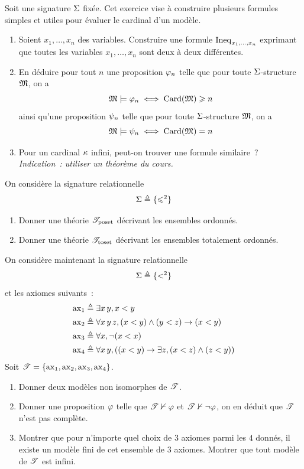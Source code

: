 \begin{exercise}
  Soit une signature $\Sigma$ fixée. Cet exercice vise à construire plusieurs
  formules simples et utiles pour évaluer le cardinal d'un modèle.
  \begin{enumerate}[label = (\roman*)]
  \item Soient $x_1,\ldots,x_n$ des variables. Construire une formule
    $\operatorname{Ineq}_{x_1,\ldots,x_n}$ exprimant que toutes les variables
    $x_1,\ldots,x_n$ sont deux à deux différentes.
  \item En déduire pour tout $n$ une proposition $\varphi_n$ telle que pour
    toute $\Sigma$-structure $\mathfrak{M}$, on a
    \[\mathfrak{M}\models \varphi_n \iff \operatorname{Card}(\mathfrak{M}) \geqslant n\]
    ainsi qu'une proposition $\psi_n$ telle que pour toute $\Sigma$-structure
    $\mathfrak{M}$, on a
    \[\mathfrak{M}\models \psi_n \iff \operatorname{Card}(\mathfrak{M}) = n\]
  \item Pour un cardinal $\kappa$ infini, peut-on trouver une formule
    similaire~? \textit{Indication~: utiliser un théorème du cours.}
  \end{enumerate}
\end{exercise}

\begin{exercise}
    On considère la signature relationnelle
    \[\Sigma \triangleq \{\leqslant^2\}\]
    \begin{enumerate}[label=(\roman*)]
        \item Donner une théorie $\mathscr T_{\operatorname{poset}}$ décrivant les
        ensembles ordonnés.
        \item Donner une théorie $\mathscr T_{\operatorname{toset}}$ décrivant les
        ensembles totalement ordonnés.
    \end{enumerate}
    On considère maintenant la signature relationnelle
    \[\Sigma \triangleq \{<^2\}\]
    et les axiomes suivants~:
    \begin{align*}
        \operatorname{ax}_1 & \triangleq \exists x\,y, x < y\\
        \operatorname{ax}_2 & \triangleq \forall x\,y\,z, (x < y) \land (y < z) \to (x < y)\\
        \operatorname{ax}_3 & \triangleq \forall x, \lnot (x < x)\\
        \operatorname{ax}_4 & \triangleq\forall x\,y, ((x < y) \to
        \exists z, (x < z) \land (z < y))
    \end{align*}
    Soit $\mathscr T = \{ \operatorname{ax}_1,\operatorname{ax}_2,\operatorname{ax}_3,\operatorname{ax}_4\}$.
    \begin{enumerate}[label=(\roman*),resume]
        \item Donner deux modèles non isomorphes de $\mathscr T$.
        \item Donner une proposition $\varphi$ telle que
        $\mathscr T\nvdash \varphi$ et $\mathscr T \nvdash \lnot\varphi$,
        on en déduit que $\mathscr T$ n'est pas complète.
        \item Montrer que pour n'importe quel choix de $3$ axiomes parmi les
        $4$ donnés, il existe un modèle fini de cet ensemble de $3$
        axiomes. Montrer que tout modèle de $\mathscr T$ est infini.
    \end{enumerate}
\end{exercise}

